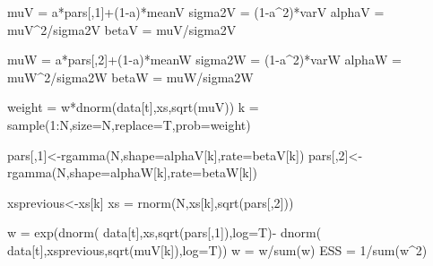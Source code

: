 \documentclass[
]{article}
\newenvironment{Shaded}{\begin{snugshade}}{\end{snugshade}}
\newcommand{\AttributeTok}[1]{\textcolor[rgb]{0.77,0.63,0.00}{#1}}
\newcommand{\DecValTok}[1]{\textcolor[rgb]{0.00,0.00,0.81}{#1}}
\newcommand{\FunctionTok}[1]{\textcolor[rgb]{0.00,0.00,0.00}{#1}}
\newcommand{\NormalTok}[1]{#1}
\newcommand{\OtherTok}[1]{\textcolor[rgb]{0.56,0.35,0.01}{#1}}
\newcommand{\SpecialCharTok}[1]{\textcolor[rgb]{0.00,0.00,0.00}{#1}}
\begin{document}
\begin{Shaded}
\begin{Highlighting}[]
\NormalTok{    muV }\OtherTok{=}\NormalTok{ a}\SpecialCharTok{*}\NormalTok{pars[,}\DecValTok{1}\NormalTok{]}\SpecialCharTok{+}\NormalTok{(}\DecValTok{1}\SpecialCharTok{{-}}\NormalTok{a)}\SpecialCharTok{*}\NormalTok{meanV}
\NormalTok{    sigma2V }\OtherTok{=}\NormalTok{ (}\DecValTok{1}\SpecialCharTok{{-}}\NormalTok{a}\SpecialCharTok{\^{}}\DecValTok{2}\NormalTok{)}\SpecialCharTok{*}\NormalTok{varV}
\NormalTok{    alphaV }\OtherTok{=}\NormalTok{ muV}\SpecialCharTok{\^{}}\DecValTok{2}\SpecialCharTok{/}\NormalTok{sigma2V}
\NormalTok{    betaV }\OtherTok{=}\NormalTok{ muV}\SpecialCharTok{/}\NormalTok{sigma2V}
    
\NormalTok{    muW }\OtherTok{=}\NormalTok{ a}\SpecialCharTok{*}\NormalTok{pars[,}\DecValTok{2}\NormalTok{]}\SpecialCharTok{+}\NormalTok{(}\DecValTok{1}\SpecialCharTok{{-}}\NormalTok{a)}\SpecialCharTok{*}\NormalTok{meanW}
\NormalTok{    sigma2W }\OtherTok{=}\NormalTok{ (}\DecValTok{1}\SpecialCharTok{{-}}\NormalTok{a}\SpecialCharTok{\^{}}\DecValTok{2}\NormalTok{)}\SpecialCharTok{*}\NormalTok{varW}
\NormalTok{    alphaW }\OtherTok{=}\NormalTok{ muW}\SpecialCharTok{\^{}}\DecValTok{2}\SpecialCharTok{/}\NormalTok{sigma2W}
\NormalTok{    betaW }\OtherTok{=}\NormalTok{ muW}\SpecialCharTok{/}\NormalTok{sigma2W}
    
\NormalTok{    weight      }\OtherTok{=}\NormalTok{ w}\SpecialCharTok{*}\FunctionTok{dnorm}\NormalTok{(data[t],xs,}\FunctionTok{sqrt}\NormalTok{(muV))}
\NormalTok{    k           }\OtherTok{=} \FunctionTok{sample}\NormalTok{(}\DecValTok{1}\SpecialCharTok{:}\NormalTok{N,}\AttributeTok{size=}\NormalTok{N,}\AttributeTok{replace=}\NormalTok{T,}\AttributeTok{prob=}\NormalTok{weight)}
    
\NormalTok{    pars[,}\DecValTok{1}\NormalTok{]}\OtherTok{\textless{}{-}}\FunctionTok{rgamma}\NormalTok{(N,}\AttributeTok{shape=}\NormalTok{alphaV[k],}\AttributeTok{rate=}\NormalTok{betaV[k])}
\NormalTok{    pars[,}\DecValTok{2}\NormalTok{]}\OtherTok{\textless{}{-}}\FunctionTok{rgamma}\NormalTok{(N,}\AttributeTok{shape=}\NormalTok{alphaW[k],}\AttributeTok{rate=}\NormalTok{betaW[k])}
    
\NormalTok{    xsprevious}\OtherTok{\textless{}{-}}\NormalTok{xs[k]}
\NormalTok{    xs }\OtherTok{=} \FunctionTok{rnorm}\NormalTok{(N,xs[k],}\FunctionTok{sqrt}\NormalTok{(pars[,}\DecValTok{2}\NormalTok{]))}
    
\NormalTok{    w           }\OtherTok{=} \FunctionTok{exp}\NormalTok{(}\FunctionTok{dnorm}\NormalTok{( data[t],xs,}\FunctionTok{sqrt}\NormalTok{(pars[,}\DecValTok{1}\NormalTok{]),}\AttributeTok{log=}\NormalTok{T)}\SpecialCharTok{{-}}
                        \FunctionTok{dnorm}\NormalTok{( data[t],xsprevious,}\FunctionTok{sqrt}\NormalTok{(muV[k]),}\AttributeTok{log=}\NormalTok{T))}
\NormalTok{    w           }\OtherTok{=}\NormalTok{ w}\SpecialCharTok{/}\FunctionTok{sum}\NormalTok{(w)}
\NormalTok{    ESS         }\OtherTok{=} \DecValTok{1}\SpecialCharTok{/}\FunctionTok{sum}\NormalTok{(w}\SpecialCharTok{\^{}}\DecValTok{2}\NormalTok{)}
    

\end{Highlighting}
\end{Shaded}
\end{document}
